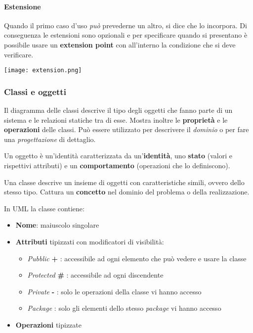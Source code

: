 \paragraph{Estensione} Quando il primo caso d'uso \textit{può} prevederne un altro, si dice che lo incorpora. Di conseguenza le estensioni sono opzionali e per specificare quando si presentano è possibile usare un \textbf{extension point} con all'interno la condizione che si deve verificare.
\begin{center}
	\texttt{[image: extension.png]}
\end{center}

\subsubsection{Classi e oggetti}
Il diagramma delle classi descrive il tipo degli oggetti che fanno parte di un sistema e le relazioni statiche tra di esse. Mostra inoltre le \textbf{proprietà} e le \textbf{operazioni} delle classi. Può essere utilizzato per descrivere il \textit{dominio} o per fare una \textit{progettazione} di dettaglio. 

\begin{definition}[Oggetto]
	Un oggetto è un'identità caratterizzata da un'\textbf{identità}, uno \textbf{stato} (valori e rispettivi attributi) e un \textbf{comportamento} (operazioni che lo definiscono).
\end{definition}
\begin{definition}[Classe]
	Una classe descrive un insieme di oggetti con caratteristiche simili, ovvero dello stesso tipo. Cattura un \textbf{concetto} nel dominio del problema o della realizzazione.
\end{definition}
\noindent In UML la classe contiene:
\begin{itemize}
	\item \textbf{Nome}: maiuscolo singolare
	\item \textbf{Attributi} tipizzati con modificatori di visibilità:
	\begin{itemize}
		\item \textit{Pubblic} \textbf{+} : accessibile ad ogni elemento che può vedere e usare la classe
		\item \textit{Protected} \textbf{\#} : accessibile ad ogni discendente
		\item \textit{Private} \textbf{-} : solo le operazioni della classe vi hanno accesso
		\item \textit{Package} \textbf{\texttildelow} : solo gli elementi dello stesso \textit{package} vi hanno accesso
	\end{itemize}
	\item \textbf{Operazioni} tipizzate
\end{itemize}
